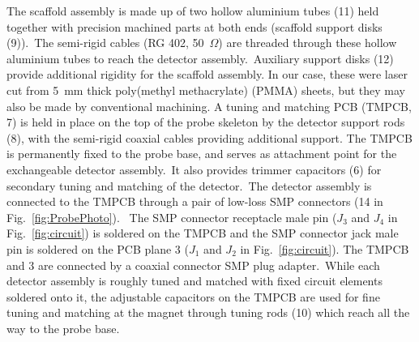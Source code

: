 \documentclass[preprint,5p]{elsarticle}
\newcommand{\fig}[1]{Fig.~\ref{#1}}
\begin{document}
The scaffold assembly is made up of two hollow aluminium tubes (11) held together with
precision machined parts at both ends (scaffold support disks (9)).\cbstart\ The semi-rigid cables (RG 402, 50~$\Omega$) are  threaded through these hollow aluminium tubes
to reach the detector assembly.\cbend\
Auxiliary support disks (12) provide additional rigidity for the scaffold assembly.
In our case, these were laser cut from 5~mm thick poly(methyl methacrylate) (PMMA) sheets,
but they may also be made by conventional machining.
A tuning and matching PCB (TMPCB, 7) is held in place on the top of the probe skeleton by
the detector support rods (8), with the semi-rigid coaxial cables providing
additional support.
The TMPCB is permanently fixed to the probe base, and serves as attachment point
for the exchangeable detector assembly.\cbstart\ It also provides
trimmer capacitors (6) for secondary tuning and matching of the detector.\cbend\ The detector assembly is connected to the TMPCB through a pair of
low-loss SMP connectors (14 in \fig{fig:ProbePhoto}). \cbstart\ The SMP connector receptacle male pin ($J_3$ and $J_4$ in \fig{fig:circuit}) is soldered on the TMPCB and the SMP connector jack male pin is soldered on the PCB plane 3 ($J_1$ and $J_2$ in \fig{fig:circuit}). The TMPCB and 3 are connected by a coaxial connector SMP plug adapter.\cbend\ While each detector assembly is roughly
tuned and matched with fixed circuit elements soldered onto it,
the adjustable capacitors on the TMPCB are used for
fine tuning and matching
at the magnet through tuning rods (10) which reach all the way to the probe base.
\end{document}
